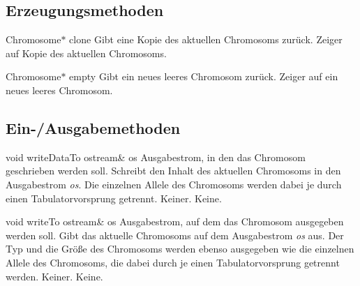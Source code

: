 \documentclass{report}
\begin{document}
\subsection{Erzeugungsmethoden}

    \setConstInstance   
    \printEmptyMethodReturn
    {Chromosome$\ast$} 
    {clone}
    {Gibt eine Kopie des aktuellen Chromosoms zur\"uck.}
    {Zeiger auf Kopie des aktuellen Chromosoms.}

\vspace{4ex}

    \printEmptyMethodReturn
    {Chromosome$\ast$} 
    {empty}
    {Gibt ein neues leeres Chromosom zur\"uck.}
    {Zeiger auf ein neues leeres Chromosom.}

\newpage
\subsection{Ein-/Ausgabemethoden}

    \printMethodWithOneParam
    {void} 
    {writeDataTo}
    {ostream\&} 
    {os} 
    {Ausgabestrom, in den das Chromosom 
    geschrieben werden soll.}
    {Schreibt den Inhalt des aktuellen Chromosoms in den Ausgabestrom
    {\em os}. Die einzelnen Allele des Chromosoms werden dabei je durch
    einen Tabulatorvorsprung getrennt.}
    {Keiner.}
    {Keine.}
    \setNormalInstance

\vspace{4ex}

    \setConstInstance
    \printMethodWithOneParam
    {void}
    {writeTo}
    {ostream\&} 
    {os} 
    {Ausgabestrom, auf dem das Chromosom ausgegeben werden soll.}
    {Gibt das aktuelle Chromosoms auf dem Ausgabestrom {\em os} aus. 
     Der Typ und die Gr\"o{\ss}e des Chromosoms werden ebenso ausgegeben wie
     die einzelnen Allele des Chromosoms, die dabei durch je einen 
     Tabulatorvorsprung getrennt werden.}
    {Keiner.}
    {Keine.}
\end{document}
